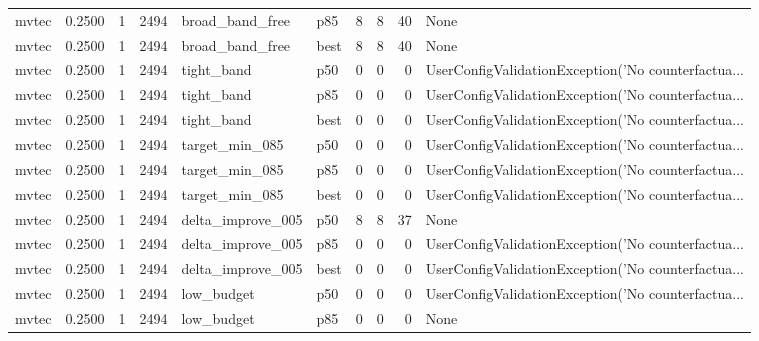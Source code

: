 \begin{tabular}{lrrrllrrrl}
   mvtec &    0.2500 &    1 &   2494 &      broad\_band\_free &    p85 &               8 &          8 &      40 &                                               None \\
   mvtec &    0.2500 &    1 &   2494 &      broad\_band\_free &   best &               8 &          8 &      40 &                                               None \\
   mvtec &    0.2500 &    1 &   2494 &           tight\_band &    p50 &               0 &          0 &       0 & UserConfigValidationException('No counterfactua... \\
   mvtec &    0.2500 &    1 &   2494 &           tight\_band &    p85 &               0 &          0 &       0 & UserConfigValidationException('No counterfactua... \\
   mvtec &    0.2500 &    1 &   2494 &           tight\_band &   best &               0 &          0 &       0 & UserConfigValidationException('No counterfactua... \\
   mvtec &    0.2500 &    1 &   2494 &       target\_min\_085 &    p50 &               0 &          0 &       0 & UserConfigValidationException('No counterfactua... \\
   mvtec &    0.2500 &    1 &   2494 &       target\_min\_085 &    p85 &               0 &          0 &       0 & UserConfigValidationException('No counterfactua... \\
   mvtec &    0.2500 &    1 &   2494 &       target\_min\_085 &   best &               0 &          0 &       0 & UserConfigValidationException('No counterfactua... \\
   mvtec &    0.2500 &    1 &   2494 &    delta\_improve\_005 &    p50 &               8 &          8 &      37 &                                               None \\
   mvtec &    0.2500 &    1 &   2494 &    delta\_improve\_005 &    p85 &               0 &          0 &       0 & UserConfigValidationException('No counterfactua... \\
   mvtec &    0.2500 &    1 &   2494 &    delta\_improve\_005 &   best &               0 &          0 &       0 & UserConfigValidationException('No counterfactua... \\
   mvtec &    0.2500 &    1 &   2494 &           low\_budget &    p50 &               0 &          0 &       0 & UserConfigValidationException('No counterfactua... \\
   mvtec &    0.2500 &    1 &   2494 &           low\_budget &    p85 &               0 &          0 &       0 &                                               None \\

\end{tabular}
